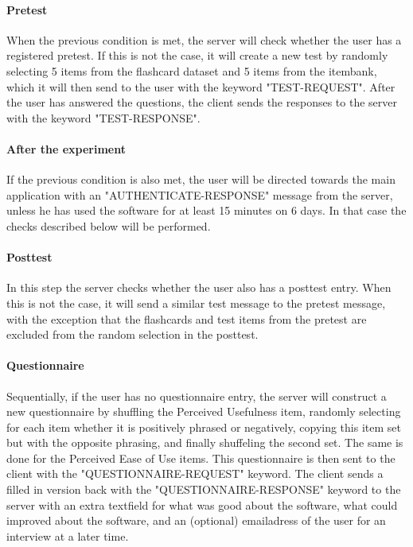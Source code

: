\paragraph{Pretest} When the previous condition is met, the server will check whether the user has a registered pretest. If this is not the case, it will create a new test by randomly selecting 5 items from the flashcard dataset and 5 items from the itembank, which it will then send to the user with the keyword "TEST-REQUEST". After the user has answered the questions, the client sends the responses to the server with the keyword "TEST-RESPONSE".

\paragraph{After the experiment} If the previous condition is also met, the user will be directed towards the main application with an "AUTHENTICATE-RESPONSE" message from the server, unless he has used the software for at least 15 minutes on 6 days. In that case the checks described below will be performed.

\paragraph{Posttest} In this step the server checks whether the user also has a posttest entry. When this is not the case, it will send a similar test message to the pretest message, with the exception that the flashcards and test items from the pretest are excluded from the random selection in the posttest.

\paragraph{Questionnaire} Sequentially, if the user has no questionnaire entry, the server will construct a new questionnaire by shuffling the Perceived Usefulness item, randomly selecting for each item whether it is positively phrased or negatively, copying this item set but with the opposite phrasing, and finally shuffeling the second set. The same is done for the Perceived Ease of Use items. This questionnaire is then sent to the client with the "QUESTIONNAIRE-REQUEST" keyword. The client sends a filled in version back with the "QUESTIONNAIRE-RESPONSE" keyword to the server with an extra textfield for what was good about the software, what could improved about the software, and an (optional) emailadress of the user for an interview at a later time.

